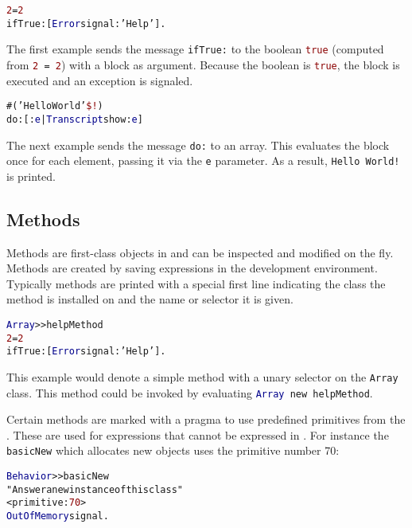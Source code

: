 \begin{alltt}
\textcolor{darkRed}{2} = \textcolor{darkRed}{2}
  ifTrue: [ \textcolor{darkBlue}{Error} signal: \textcolor{string}{'Help'} ].
\end{alltt}

The first example sends the message \texttt{ifTrue:} to the boolean
\textcolor{darkRed}{\texttt{true}} (computed from \texttt{\textcolor{darkRed}{2} = \textcolor{darkRed}{2}}) with a block as argument.
Because the boolean is \textcolor{darkRed}{\texttt{true}}, the block is executed and an exception is signaled.

\begin{alltt}
\#(\textcolor{string}{'Hello World'} \textcolor{darkRed}{\$!})
  do: [ :\textcolor{darkBlue}{e} | \textcolor{darkBlue}{Transcript} show: \textcolor{darkBlue}{e} ]
\end{alltt}

The next example sends the message \texttt{do:} to an array.
This evaluates the block once for each element, passing it via the \texttt{e} parameter.
As a result, \texttt{\textcolor{string}{Hello~World!}} is printed.


\subsection{Methods}

Methods are first-class objects in \PH and can be inspected and modified on the fly.
Methods are created by saving expressions in the \PH development environment.
Typically methods are printed with a special first line indicating the class the method is installed on and the name or selector it is given.

\begin{alltt}
\textcolor{darkBlue}{Array} >> helpMethod
    \textcolor{darkRed}{2} = \textcolor{darkRed}{2}
        ifTrue: [ \textcolor{darkBlue}{Error} signal: \textcolor{string}{'Help'} ].
\end{alltt}

This example would denote a simple method with a unary selector on the \texttt{Array} class.
This method could be invoked by evaluating \texttt{\textcolor{darkBlue}{Array} new helpMethod}.

Certain methods are marked with a pragma to use predefined primitives from the \VM.
These are used for expressions that cannot be expressed in \PH.
For instance the \texttt{basicNew} which allocates new objects uses the primitive number 70:

\begin{alltt}
\textcolor{darkBlue}{Behavior} >> basicNew
    \textcolor{comment}{"Answer a new instance of this class"}
    <primitive: \textcolor{darkRed}{70}>
    \textcolor{darkBlue}{OutOfMemory} signal.
\end{alltt}


